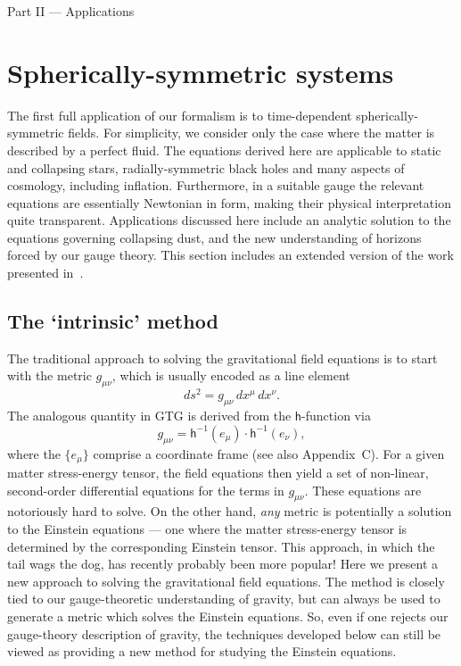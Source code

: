 \documentclass[a4paper]{article}
\numberwithin{equation}{section}
\newcommand{\dt}{\! \cdot \!}
\newcommand{\lih}{\mathsf{h}}
\newcommand{\hu}{\lih}
\begin{document}
\begin{center}
{\LARGE Part II --- Applications}
\end{center}

\newpage


\section{Spherically-symmetric systems}
\label{SS}

The first full application of our formalism is to time-dependent
spherically-symmetric fields.  For simplicity, we consider only the
case where the matter is described by a perfect fluid.  The equations
derived here are applicable to static and collapsing stars,
radially-symmetric black holes and many aspects of cosmology,
including inflation.  Furthermore, in a suitable gauge the relevant
equations are essentially Newtonian in form, making their physical
interpretation quite transparent.  Applications discussed here include
an analytic solution to the equations governing collapsing dust, and
the new understanding of horizons forced by our gauge theory.  This
section includes an extended version of the work presented
in~\cite{DGL-erice}.


\subsection{The `intrinsic' method}

The traditional approach to solving the gravitational field equations
is to start with the metric $g_{\mu \nu}$, which is usually encoded as
a line element
%
\begin{equation}
ds^2 = g_{\mu\nu} \, dx^\mu \, dx^{\nu}.
\end{equation} 
%
The analogous quantity in GTG is derived from the $\lih$-function via
%
\begin{equation}
g_{\mu\nu} = \hu^{-1}(e_\mu) \dt \hu^{-1}(e_\nu),
\label{SS-int1}
\end{equation} 
%
where the $\{e_{\mu}\}$ comprise a coordinate frame (see also
Appendix~C).  For a given matter stress-energy tensor, the field
equations then yield a set of non-linear, second-order differential
equations for the terms in $g_{\mu\nu}$.  These equations are
notoriously hard to solve.  On the other hand, \textit{any} metric is
potentially a solution to the Einstein equations --- one where the
matter stress-energy tensor is determined by the corresponding
Einstein tensor.  This approach, in which the tail wags the dog, has
recently probably been more popular!  Here we present a new approach
to solving the gravitational field equations.  The method is closely
tied to our gauge-theoretic understanding of gravity, but can always
be used to generate a metric which solves the Einstein equations.  So,
even if one rejects our gauge-theory description of gravity, the
techniques developed below can still be viewed as providing a new
method for studying the Einstein equations.
\end{document}
